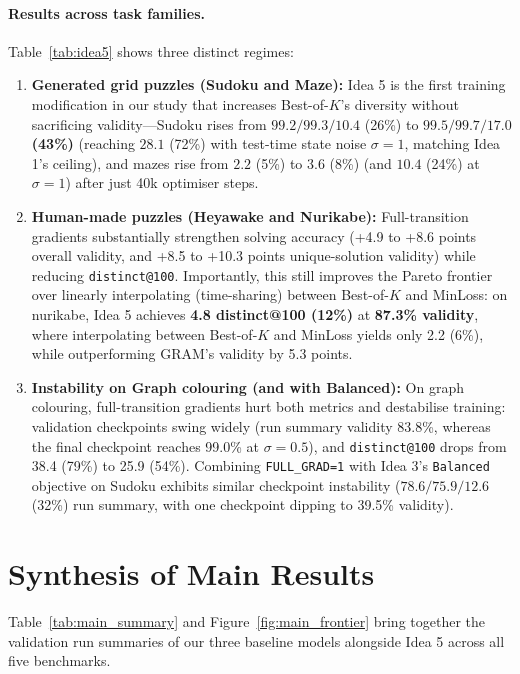 \documentclass[11pt]{article}
\newcommand{\Bok}{Best-of-$K$}
\begin{document}
\paragraph{Results across task families.}
Table~\ref{tab:idea5} shows three distinct regimes:
\begin{enumerate}
  \item \textbf{Generated grid puzzles (Sudoku and Maze):} Idea 5 is the first training modification in our study that increases \Bok{}'s diversity without sacrificing validity---Sudoku rises from $99.2 / 99.3 / 10.4$ (26\%) to \textbf{$99.5 / 99.7 / 17.0$ (43\%)} (reaching $28.1$ (72\%) with test-time state noise $\sigma=1$, matching Idea 1's ceiling), and mazes rise from $2.2$ (5\%) to $3.6$ (8\%) (and $10.4$ (24\%) at $\sigma=1$) after just 40k optimiser steps.
  \item \textbf{Human-made puzzles (Heyawake and Nurikabe):} Full-transition gradients substantially strengthen solving accuracy (+4.9 to +8.6 points overall validity, and +8.5 to +10.3 points unique-solution validity) while reducing \texttt{distinct@100}. Importantly, this still improves the Pareto frontier over linearly interpolating (time-sharing) between \Bok{} and MinLoss: on nurikabe, Idea 5 achieves \textbf{4.8 distinct@100 (12\%)} at \textbf{87.3\% validity}, where interpolating between \Bok{} and MinLoss yields only 2.2 (6\%), while outperforming GRAM's validity by 5.3 points.
  \item \textbf{Instability on Graph colouring (and with Balanced):} On graph colouring, full-transition gradients hurt both metrics and destabilise training: validation checkpoints swing widely (run summary validity 83.8\%, whereas the final checkpoint reaches 99.0\% at $\sigma=0.5$), and \texttt{distinct@100} drops from 38.4 (79\%) to 25.9 (54\%). Combining \texttt{FULL\_GRAD=1} with Idea 3's \texttt{Balanced} objective on Sudoku exhibits similar checkpoint instability ($78.6 / 75.9 / 12.6$ (32\%) run summary, with one checkpoint dipping to 39.5\% validity).
\end{enumerate}

\section{Synthesis of Main Results}
\label{sec:main_results}

Table~\ref{tab:main_summary} and Figure~\ref{fig:main_frontier} bring together the validation run summaries of our three baseline models alongside Idea 5 across all five benchmarks.
\end{document}
